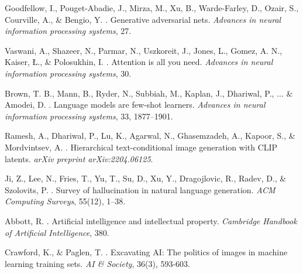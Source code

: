 \documentclass[12pt,a4paper]{article}
\begin{document}

\begin{thebibliography}{99}

Goodfellow, I., Pouget-Abadie, J., Mirza, M., Xu, B., Warde-Farley, D., Ozair, S., Courville, A., \& Bengio, Y. . Generative adversarial nets. \emph{Advances in neural information processing systems}, 27.

Vaswani, A., Shazeer, N., Parmar, N., Uszkoreit, J., Jones, L., Gomez, A. N., Kaiser, {\L}., \& Polosukhin, I. . Attention is all you need. \emph{Advances in neural information processing systems}, 30.

Brown, T. B., Mann, B., Ryder, N., Subbiah, M., Kaplan, J., Dhariwal, P., ... \& Amodei, D. . Language models are few-shot learners. \emph{Advances in neural information processing systems}, 33, 1877--1901.

Ramesh, A., Dhariwal, P., Lu, K., Agarwal, N., Ghasemzadeh, A., Kapoor, S., \& Mordvintsev, A. . Hierarchical text-conditional image generation with CLIP latents. \emph{arXiv preprint arXiv:2204.06125}.

Ji, Z., Lee, N., Fries, T., Yu, T., Su, D., Xu, Y., Dragojlovic, R., Radev, D., \& Szolovits, P. . Survey of hallucination in natural language generation. \emph{ACM Computing Surveys}, 55(12), 1--38.

Abbott, R. . Artificial intelligence and intellectual property. \emph{Cambridge Handbook of Artificial Intelligence}, 380.

Crawford, K., \& Paglen, T. . Excavating AI: The politics of images in machine learning training sets. \emph{AI \& Society}, 36(3), 593-603.

\end{thebibliography}
\end{document}
